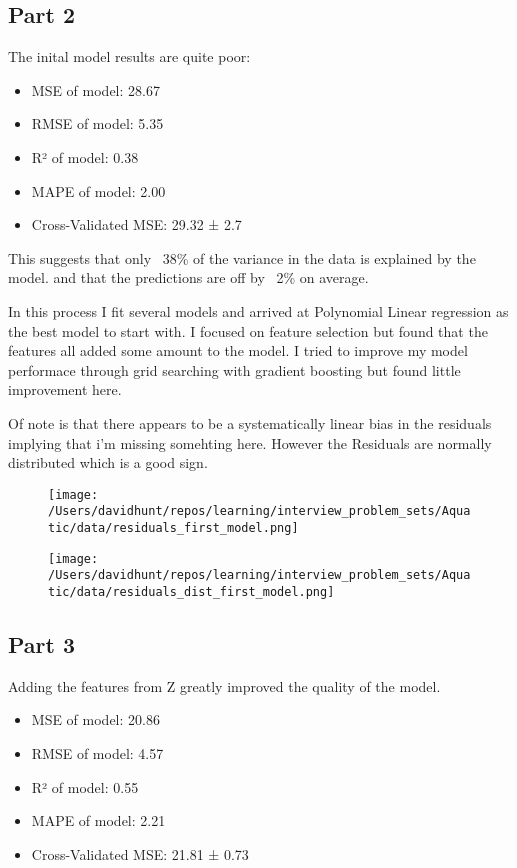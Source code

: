 \documentclass{article}
\begin{document}
\subsection*{Part 2}
The inital model results are quite poor:\newline
\begin{itemize}
    \item MSE of model: 28.67
    \item RMSE of model: 5.35
    \item R² of model: 0.38
    \item MAPE of model: 2.00
    \item Cross-Validated MSE: 29.32 ± 2.7
\end{itemize}
This suggests that only ~38\% of the variance in the data is explained by the model.
and that the predictions are off by ~2\% on average.\newline

In this process I fit several models and arrived at Polynomial Linear regression as the best model to start with. 
I focused on feature selection but found that the features all added some amount to the model.
I tried to improve my model performace through grid searching with gradient boosting but found little improvement here.

Of note is that there appears to be a systematically linear bias in the residuals implying that i'm missing somehting here. However the Residuals are normally distributed which is a good sign.

\begin{figure}[h!]  %
    \centering  %
    \texttt{[image: /Users/davidhunt/repos/learning/interview\_problem\_sets/Aquatic/data/residuals\_first\_model.png]}  %
\end{figure}
\begin{figure}[h!]  %
    \centering  %
    \texttt{[image: /Users/davidhunt/repos/learning/interview\_problem\_sets/Aquatic/data/residuals\_dist\_first\_model.png]}  %
\end{figure}
\pagebreak
\subsection*{Part 3}
Adding the features from Z greatly improved the quality of the model.
\begin{itemize}
    \item MSE of model: 20.86
    \item RMSE of model: 4.57
    \item R² of model: 0.55
    \item MAPE of model: 2.21
    \item Cross-Validated MSE: 21.81 ± 0.73
\end{itemize}
\end{document}
